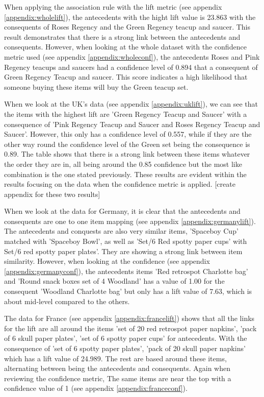 \documentclass[a4paper,10pt]{article}
\begin{document}
When applying the association rule with the lift metric (see appendix \ref{appendix:wholelift}), the antecedents with the hight lift value is 23.863 with the consequents of Roses Regency and the Green Regency teacup and saucer. This result demonstrates that there is a strong link between the antecedents and consequents. However, when looking at the whole dataset with the confidence metric used (see appendix \ref{appendix:wholeconf}), the antecedents Roses and Pink Regency teacups and saucers had a confidence level of 0.894 that a consequent of Green Regency Teacup and saucer. This score indicates a high likelihood that someone buying these items will buy the Green teacup set.

When we look at the UK's data (see appendix \ref{appendix:uklift}), we can see that the items with the highest lift are 'Green Regency Teacup and Saucer' with a consequence of 'Pink Regency Teacup and Saucer and Roses Regency Teacup and Saucer'. However, this only has a confidence level of 0.557, while if they are the other way round the confidence level of the Green set being the consequence is 0.89. The table shows that there is a strong link between these items whatever the order they are in, all being around the 0.85 confidence but the most like combination is the one stated previously. These results are evident within the results focusing on the data when the confidence metric is applied. [create appendix for these two results]

When we look at the data for Germany, it is clear that the antecedents and consequents are one to one item mapping (see appendix \ref{appendix:germanylift}). The antecedents and conquests are also very similar items, 'Spaceboy Cup' matched with 'Spaceboy Bowl', as well as 'Set/6 Red spotty paper cups' with Set/6 red spotty paper plates'. They are showing a strong link between item similarity. However, when looking at the confidence (see appendix \ref{appendix:germanyconf}), the antecedents items 'Red retrospot Charlotte bag' and 'Round snack boxes set of 4 Woodland' has a value of 1.00 for the consequent 'Woodland Charlotte bag' but only has a lift value of 7.63, which is about mid-level compared to the others.

The data for France (see appendix \ref{appendix:francelift}) shows that all the links for the lift are all around the items 'set of 20 red retrospot paper napkins', 'pack of 6 skull paper plates', 'set of 6 spotty paper cups' for antecedents. With the consequence of 'set of 6 spotty paper plates', 'pack of 20 skull paper napkins' which has a lift value of 24.989. The rest are based around these items, alternating between being the antecedents and consequents. Again when reviewing the confidence metric, The same items are near the top with a confidence value of 1 (see appendix \ref{appendix:franceconf}).
\end{document}
